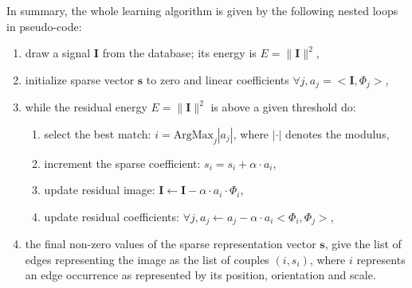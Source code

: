 \documentclass[a4paper, 10pt, twocolumns]{article}
\begin{document}
In summary, the whole learning algorithm is given by the following nested loops
in pseudo-code:
\begin{enumerate}
\item draw a signal $\mathbf{I}$ from the database; its energy is $E = \| \mathbf{I} \|^2$,
\item initialize sparse vector $\mathbf{s}$ to zero and linear coefficients $\forall j, {a}_j=<\mathbf{I}, \Phi_j >$,
\item while the residual energy $E = \| \mathbf{I} \|^2$ is above a given threshold do:
\begin{enumerate}
\item select the best match: $i = \mbox{ArgMax}_{j} | {a}_j |$, where $| \cdot |$ denotes the modulus,
\item increment the sparse coefficient: $s_{i} = s_{i} + \alpha \cdot {a}_{i}$,
\item update residual image: $ \mathbf{I} \leftarrow \mathbf{I} - \alpha \cdot a_{i} \cdot \Phi_{i} $,
\item update residual coefficients: $\forall j, {a}_j \leftarrow {a}_j - \alpha \cdot a_{i} <\Phi_{i} , \Phi_j > $,
\end{enumerate}
\item the final non-zero values of the sparse representation vector
$\mathbf{s}$, give the list of edges representing the
image as the list of couples $(i, s_{i})$, where $i$ represents an edge occurrence
as represented by its position, orientation and scale.
\end{enumerate}
\end{document}
